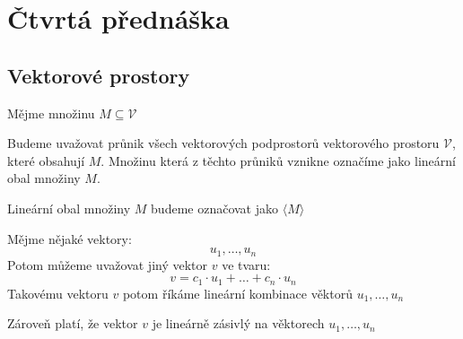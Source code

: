 \section{Čtvrtá přednáška}
\subsection{Vektorové prostory}

\begin{definition}
    Mějme množinu $M \subseteq \mathcal{V}$

    Budeme uvažovat průnik všech vektorových podprostorů vektorového prostoru $\mathcal{V}$,
    které obsahují $M$. Množinu která z těchto průniků vznikne označíme jako lineární obal
    množiny $M$.

    Lineární obal množiny $M$ budeme označovat jako $\langle M \rangle$
\end{definition}

\begin{definition}
    Mějme nějaké vektory:
    $$u_1, \ldots, u_n$$
    Potom můžeme uvažovat jiný vektor $v$ ve tvaru:
    $$v = c_1 \cdot u_1 + \ldots + c_n \cdot u_n$$
    Takovému vektoru $v$ potom říkáme lineární kombinace věktorů $u_1, \ldots, u_n$

    Zároveň platí, že vektor $v$ je lineárně zásivlý na věktorech $u_1, \ldots, u_n$
\end{definition}

